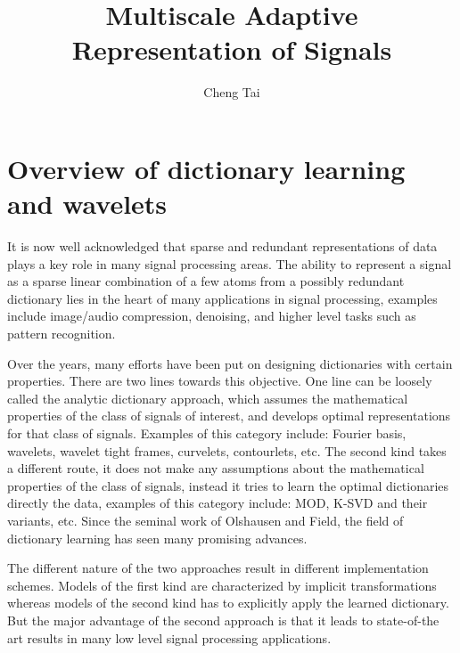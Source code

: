 \documentclass[a4paper]{article}
\begin{document}
\newtheorem{lem}{Lemma}
\newtheorem{prop}{Proposition}
\newtheorem{rem}{Remark}
\renewcommand{\a}{\mathbf{a}}
\renewcommand{\v}{\mathbf{v}}
\title{Multiscale Adaptive Representation of Signals}
\author{Cheng Tai}
\date{}
\maketitle
{}
\tableofcontents
\newpage\section{Overview of dictionary learning and wavelets}
It is now well acknowledged that sparse and redundant representations of data plays a key role in many signal processing areas. The ability to represent a signal as a sparse linear combination of a few atoms from a possibly redundant dictionary lies in the heart of many applications in signal processing, examples include image/audio compression, denoising, and higher level tasks such as pattern recognition.

Over the years, many efforts have been put on designing dictionaries with certain properties. There are two lines towards this objective.  One line can be loosely called the analytic dictionary approach, which assumes the mathematical properties of the class of signals of interest, and develops optimal representations for that class of signals. Examples of this category include: Fourier basis, wavelets, wavelet tight frames, curvelets, contourlets, etc. The second kind takes a different route, it does not make any assumptions about the mathematical properties of the class of signals, instead it tries to learn the optimal dictionaries directly the data, examples of this category include: MOD, K-SVD and their variants, etc. Since the seminal work of Olshausen and Field, the field of dictionary learning has seen many promising advances. 


The different nature of the two approaches result in different implementation schemes. Models of the first kind are characterized by implicit transformations whereas models of the second kind has to explicitly apply the learned dictionary. But the major advantage of the second approach is that it leads to state-of-the art results in many low level signal processing applications. 
\end{document}

